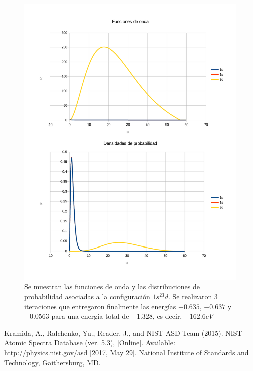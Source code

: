 \documentclass[a4paper]{article}
\begin{document}
\begin{figure}
\begin{center}
\includegraphics[width = \textwidth]{1s_1s_3d.pdf}
\caption{\label{fig:3d}Se muestran las funciones de onda y las distribuciones de probabilidad asociadas a la configuración $1s^23d$. Se realizaron 3 iteraciones que entregaron finalmente las energías $-0.635$, $-0.637$ y $-0.0563$ para una energía total de $-1.328$, es decir, $-162.6eV$}
\end{center}
\end{figure}

\begin{thebibliography}{1}
 Kramida, A., Ralchenko, Yu., Reader, J., and NIST ASD Team (2015). NIST Atomic Spectra Database (ver. 5.3), [Online]. Available: http://physics.nist.gov/asd [2017, May 29]. National Institute of Standards and Technology, Gaithersburg, MD. 
\end{thebibliography}
\end{document}
